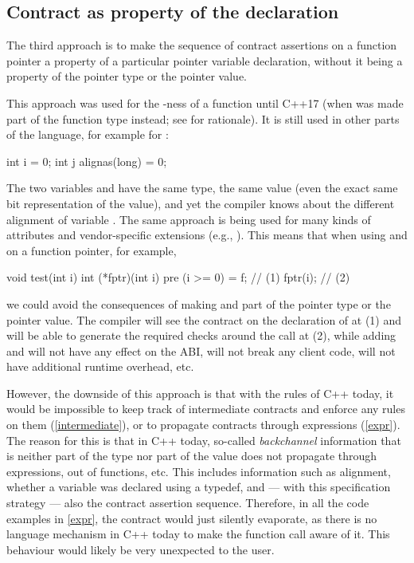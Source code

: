 
\subsection{Contract as property of the declaration}
\label{decl}

The third approach is to make the sequence of contract assertions on a function pointer a property of a particular pointer variable declaration, without it being a property of the pointer type or the pointer value.

This approach was used for the -ness of a function until C++17 (when  was made part of the function type instead; see \cite{P0012R1} for rationale). It is still used in other parts of the language, for example for :
\begin{codeblock}
int i = 0;
int j alignas(long) = 0;
\end{codeblock}
The two variables  and  have the same type, the same value (even the exact same bit representation of the value), and yet the compiler knows about the different alignment of variable . The same approach is being used for many kinds of attributes and vendor-specific extensions (e.g., ). This means that when using   and  on a function pointer, for example,
\begin{codeblock}
void test(int i) {
  int (*fptr)(int i) pre (i >= 0) = f;  // (1)
  fptr(i);  // (2)
}
\end{codeblock}
we could avoid the consequences of making   and  part of the pointer type or the pointer value. The compiler will see the contract on the declaration of  at (1) and will be able to generate the required checks around the call at (2), while adding  and  will not have any effect on the ABI, will not break any client code, will not have additional runtime overhead, etc.

However, the downside of this approach is that with the rules of C++ today, it would be impossible to keep track of intermediate contracts and enforce any rules on them (\ref{intermediate}), or to propagate contracts through expressions (\ref{expr}). The reason for this is that in C++ today, so-called \emph{backchannel} information that is neither part of the type nor part of the value does not propagate through expressions, out of functions, etc. This includes information such as alignment, whether a variable was declared using a typedef, and --- with this specification strategy --- also the contract assertion sequence. Therefore, in all the code examples in \ref{expr}, the contract would just silently evaporate, as there is no language mechanism in C++ today to make the function call aware of it. This behaviour would likely be very unexpected to the user.

